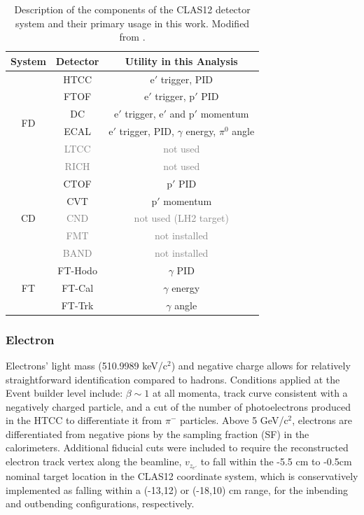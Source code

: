     \begin{table}[htb]
        \centering
        \begin{tabular}{c|c|c}
            System & Detector  & Utility in this Analysis \\
            \hline
            \multirow{6}{*}{FD} & HTCC & $\mathrm{e'}$ trigger, PID \\
            & FTOF & $\mathrm{e'}$ trigger, $\mathrm{p'}$ PID \\
            & DC & $\mathrm{e'}$ trigger, $\mathrm{e'}$ and $\mathrm{p'}$ momentum \\
            & ECAL & $\mathrm{e'}$ trigger, PID, $\gamma$ energy, $\pi^0$ angle \\
            & \textcolor{gray}{LTCC} & \textcolor{gray}{not used} \\
            & \textcolor{gray}{RICH} & \textcolor{gray}{not used} \\
            \hline
            \multirow{5}{*}{CD} & CTOF & $\mathrm{p'}$ PID \\
            & CVT & $\mathrm{p'}$ momentum \\
            & \textcolor{gray}{CND} & \textcolor{gray}{not used (LH2 target)} \\
            & \textcolor{gray}{FMT} & \textcolor{gray}{not installed} \\
            & \textcolor{gray}{BAND} & \textcolor{gray}{not installed} \\
            \hline
            \multirow{3}{*}{FT} & FT-Hodo & $\gamma$ PID \\
            & FT-Cal & $\gamma$ energy \\
            & FT-Trk & $\gamma$ angle \\
        \end{tabular}
        \caption[CLAS12 Detectors Main Functions]{Description of the components of the CLAS12 detector system and their primary usage in this work. Modified from \parencite{Lee2022MeasurementDetector}.}
        \label{tab:detector_components}
    \end{table}

    \subsubsection*{Electron}
        Electrons' light mass (510.9989 keV/c$^2$) and negative charge allows for relatively straightforward identification compared to hadrons. Conditions applied at the Event builder level include: $\beta \sim 1$ at all momenta, track curve consistent with a negatively charged particle, and a cut of the number of photoelectrons produced in the HTCC to differentiate it from $\pi^-$ particles. Above 5 GeV/c$^2$, electrons are differentiated from negative pions by the sampling fraction (SF) in the calorimeters. Additional fiducial cuts were included to require the reconstructed electron track vertex along the beamline, $v_{z_{e'}}$ to fall within the -5.5 cm to -0.5cm nominal target location in the CLAS12 coordinate system, which is conservatively implemented as falling within a (-13,12) or (-18,10) cm range, for the inbending and outbending configurations, respectively. 
        
